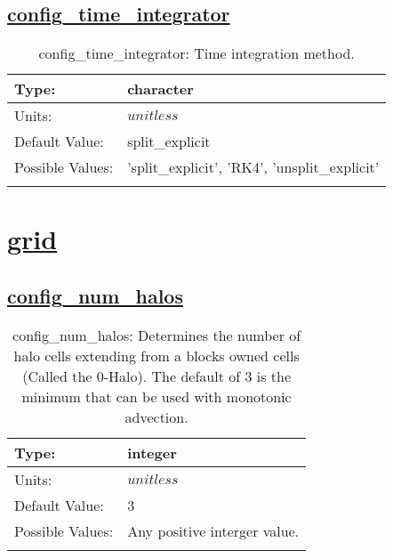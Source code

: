 \subsection[config\_time\_integrator]{\hyperref[sec:nm_tab_time_integration]{config\_time\_integrator}}
\label{subsec:nm_sec_config_time_integrator}
\begin{center}
\begin{longtable}{| p{2.0in} | p{4.0in} |}
    \hline
    Type: & character \\
    \hline
    Units: & $unitless$ \\
    \hline
    Default Value: & split\_explicit \\
    \hline
    Possible Values: & 'split\_explicit', 'RK4', 'unsplit\_explicit' \\
    \hline
    \caption{config\_time\_integrator: Time integration method.}
\end{longtable}
\end{center}
\section[grid]{\hyperref[sec:nm_tab_grid]{grid}}
\label{sec:nm_sec_grid}
\subsection[config\_num\_halos]{\hyperref[sec:nm_tab_grid]{config\_num\_halos}}
\label{subsec:nm_sec_config_num_halos}
\begin{center}
\begin{longtable}{| p{2.0in} | p{4.0in} |}
    \hline
    Type: & integer \\
    \hline
    Units: & $unitless$ \\
    \hline
    Default Value: & 3 \\
    \hline
    Possible Values: & Any positive interger value. \\
    \hline
    \caption{config\_num\_halos: Determines the number of halo cells extending from a blocks owned cells (Called the 0-Halo). The default of 3 is the minimum that can be used with monotonic advection.}
\end{longtable}
\end{center}
